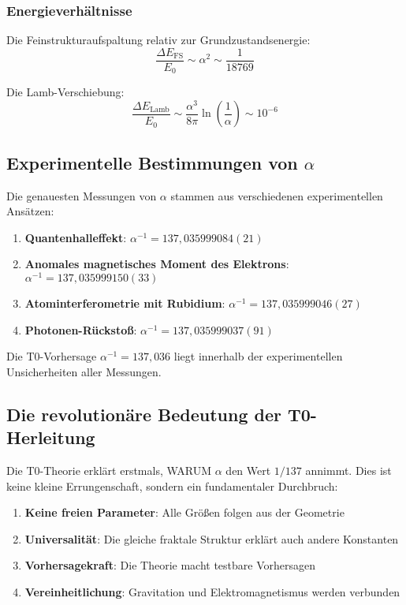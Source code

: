 \documentclass[12pt,a4paper]{article}
\theoremstyle{definition}
\begin{document}
	\subsubsection{Energieverhältnisse}
	
	Die Feinstrukturaufspaltung relativ zur Grundzustandsenergie:
	\begin{equation}
		\frac{\Delta E_{\text{FS}}}{E_0} \sim \alpha^2 \sim \frac{1}{18769}
	\end{equation}
	
	Die Lamb-Verschiebung:
	\begin{equation}
		\frac{\Delta E_{\text{Lamb}}}{E_0} \sim \frac{\alpha^3}{8\pi} \ln\left(\frac{1}{\alpha}\right) \sim 10^{-6}
	\end{equation}
	
	\subsection{Experimentelle Bestimmungen von $\alpha$}
	
	Die genauesten Messungen von $\alpha$ stammen aus verschiedenen experimentellen Ansätzen:
	
	\begin{enumerate}
		\item \textbf{Quantenhalleffekt}: $\alpha^{-1} = 137{,}035999084(21)$
		\item \textbf{Anomales magnetisches Moment des Elektrons}: $\alpha^{-1} = 137{,}035999150(33)$
		\item \textbf{Atominterferometrie mit Rubidium}: $\alpha^{-1} = 137{,}035999046(27)$
		\item \textbf{Photonen-Rückstoß}: $\alpha^{-1} = 137{,}035999037(91)$
	\end{enumerate}
	
	Die T0-Vorhersage $\alpha^{-1} = 137{,}036$ liegt innerhalb der experimentellen Unsicherheiten aller Messungen.
	
	\subsection{Die revolutionäre Bedeutung der T0-Herleitung}
	
	Die T0-Theorie erklärt erstmals, WARUM $\alpha$ den Wert $1/137$ annimmt. Dies ist keine kleine Errungenschaft, sondern ein fundamentaler Durchbruch:
	
	\begin{enumerate}
		\item \textbf{Keine freien Parameter}: Alle Größen folgen aus der Geometrie
		\item \textbf{Universalität}: Die gleiche fraktale Struktur erklärt auch andere Konstanten
		\item \textbf{Vorhersagekraft}: Die Theorie macht testbare Vorhersagen
		\item \textbf{Vereinheitlichung}: Gravitation und Elektromagnetismus werden verbunden
	\end{enumerate}
	
\end{document}
